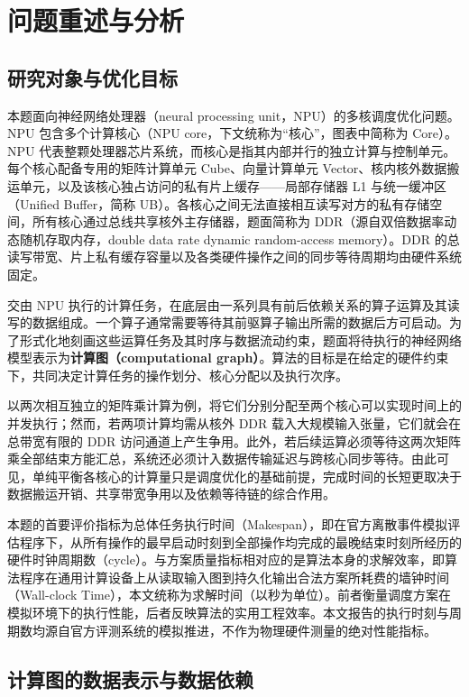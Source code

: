 \documentclass[anonymous,withtoc]{gmcm2026}
\begin{document}
\section{问题重述与分析}

\subsection{研究对象与优化目标}

本题面向神经网络处理器（neural processing unit，NPU）的多核调度优化问题。NPU 包含多个计算核心（NPU core，下文统称为``核心''，图表中简称为 Core）。NPU 代表整颗处理器芯片系统，而核心是指其内部并行的独立计算与控制单元。每个核心配备专用的矩阵计算单元 Cube、向量计算单元 Vector、核内核外数据搬运单元，以及该核心独占访问的私有片上缓存------局部存储器 L1 与统一缓冲区（Unified Buffer，简称 UB）。各核心之间无法直接相互读写对方的私有存储空间，所有核心通过总线共享核外主存储器，题面简称为 DDR（源自双倍数据率动态随机存取内存，double data rate dynamic random-access memory）。DDR 的总读写带宽、片上私有缓存容量以及各类硬件操作之间的同步等待周期均由硬件系统固定。

交由 NPU 执行的计算任务，在底层由一系列具有前后依赖关系的算子运算及其读写的数据组成。一个算子通常需要等待其前驱算子输出所需的数据后方可启动。为了形式化地刻画这些运算任务及其时序与数据流动约束，题面将待执行的神经网络模型表示为\textbf{计算图（computational graph）}。算法的目标是在给定的硬件约束下，共同决定计算任务的操作划分、核心分配以及执行次序\cite{ref1}。

以两次相互独立的矩阵乘计算为例，将它们分别分配至两个核心可以实现时间上的并发执行；然而，若两项计算均需从核外 DDR 载入大规模输入张量，它们就会在总带宽有限的 DDR 访问通道上产生争用。此外，若后续运算必须等待这两次矩阵乘全部结束方能汇总，系统还必须计入数据传输延迟与跨核心同步等待。由此可见，单纯平衡各核心的计算量只是调度优化的基础前提，完成时间的长短更取决于数据搬运开销、共享带宽争用以及依赖等待链的综合作用。

本题的首要评价指标为总体任务执行时间（Makespan），即在官方离散事件模拟评估程序下，从所有操作的最早启动时刻到全部操作均完成的最晚结束时刻所经历的硬件时钟周期数（cycle）。与方案质量指标相对应的是算法本身的求解效率，即算法程序在通用计算设备上从读取输入图到持久化输出合法方案所耗费的墙钟时间（Wall-clock Time），本文统称为求解时间（以秒为单位）。前者衡量调度方案在模拟环境下的执行性能，后者反映算法的实用工程效率。本文报告的执行时刻与周期数均源自官方评测系统的模拟推进，不作为物理硬件测量的绝对性能指标。

\subsection{计算图的数据表示与数据依赖}
\end{document}
